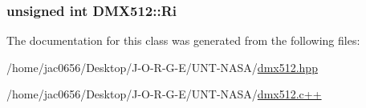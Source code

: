 \subsubsection[{\texorpdfstring{Ri}{Ri}}]{\setlength{\rightskip}{0pt plus 5cm}unsigned int D\+M\+X512\+::\+Ri}\hypertarget{classDMX512_aa5ffc37b24d0a79180d13663a5cf8379}{}\label{classDMX512_aa5ffc37b24d0a79180d13663a5cf8379}


The documentation for this class was generated from the following files\+:\begin{DoxyCompactItemize}
\item 
/home/jac0656/\+Desktop/\+J-\/\+O-\/\+R-\/\+G-\/\+E/\+U\+N\+T-\/\+N\+A\+S\+A/\hyperlink{dmx512_8hpp}{dmx512.\+hpp}\item 
/home/jac0656/\+Desktop/\+J-\/\+O-\/\+R-\/\+G-\/\+E/\+U\+N\+T-\/\+N\+A\+S\+A/\hyperlink{dmx512_8c_09_09}{dmx512.\+c++}\end{DoxyCompactItemize}
